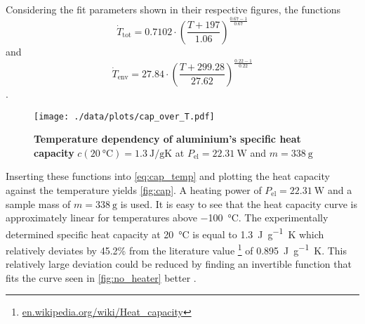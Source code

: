 Considering the fit parameters shown in their respective figures, the functions
\begin{equation*}
	\dot{T}_\text{tot} = 0.7102\cdot\left(\frac{T+197}{1.06}\right)^{\frac{0.67-1}{0.67}}
\end{equation*}
and
\begin{equation*}
	\dot{T}_\text{env} = 27.84\cdot\left(\frac{T+299.28}{27.62}\right)^{\frac{0.22-1}{0.22}}
\end{equation*}
.

\begin{figure}[tbp]
	\centering
	\texttt{[image: ./data/plots/cap\_over\_T.pdf]}
	\caption[Temperature dependency of aluminium's specific heat capacity]{\textbf{Temperature dependency of aluminium's specific heat capacity} $c(\SI{20}{\celsius})=\SI{1.3}{\joule\per\gram\kelvin}$ at $P_\text{el}=\SI{22.31}{\watt}$ and $m=\SI{338}{\gram}$}
	\label{fig:cap}
\end{figure}
Inserting these functions into \autoref{eq:cap_temp} and plotting  the heat capacity against the temperature yields \autoref{fig:cap}.
A heating power  of $P_\text{el}=\SI{22.31}{\watt}$ and a sample mass of $m=\SI{338}{\gram}$ is used.
It is easy to see that the heat capacity curve is approximately linear for temperatures above \SI{-100}{\celsius}.
The experimentally determined specific heat capacity at \SI{20}{\celsius} is equal to \SI{1.3}{\joule\per\gram\kelvin} which relatively deviates by \num{45.2}\% from the literature value \footnote{\url{en.wikipedia.org/wiki/Heat_capacity}} of \SI{0.895}{\joule\per\gram\kelvin}.
This relatively large deviation could be reduced by finding an invertible function that fits the curve seen in \autoref{fig:no_heater} better .
